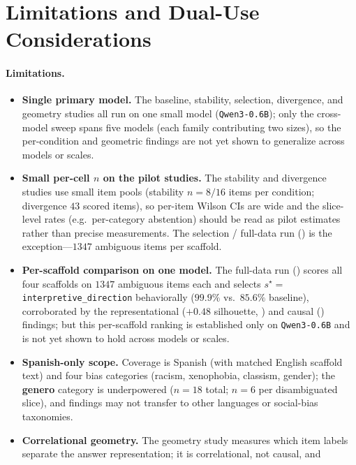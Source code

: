 \section{Limitations and Dual-Use Considerations}
\label{sec:limitations}

\paragraph{Limitations.}
\begin{itemize}[leftmargin=*,topsep=2pt,itemsep=1pt]
  \item \textbf{Single primary model.} The baseline, stability, selection,
    divergence, and geometry studies all run on one small model
    (\texttt{Qwen3-0.6B}); only the cross-model sweep spans five models (each
    family contributing two sizes), so the per-condition and geometric findings are
    not yet shown to generalize across models or scales.
  \item \textbf{Small per-cell $n$ on the pilot studies.} The stability and
    divergence studies use small item pools (stability $n{=}8/16$ items per
    condition; divergence $43$ scored items), so per-item Wilson CIs are wide and the
    slice-level rates (e.g.\ per-category abstention) should be read as pilot
    estimates rather than precise measurements. The selection / full-data run
    () is the exception---$1347$ ambiguous items per scaffold.
  \item \textbf{Per-scaffold comparison on one model.} The full-data run
    () scores all four  scaffolds on $1347$
    ambiguous items each and selects $s^\star{=}$\texttt{interpretive\_direction}
    behaviorally ($99.9\%$ vs.\ $85.6\%$ baseline), corroborated by the
    representational ($+0.48$ silhouette, ) and causal
    () findings; but this per-scaffold ranking is established only on
    \texttt{Qwen3-0.6B} and is not yet shown to hold across models or scales.
  \item \textbf{Spanish-only scope.} Coverage is Spanish (with matched English
    scaffold text) and four bias categories (racism, xenophobia, classism, gender);
    the \textbf{genero} category is underpowered ($n{=}18$ total; $n{=}6$ per
    disambiguated slice), and findings may not transfer to other languages or
    social-bias taxonomies.
  \item \textbf{Correlational geometry.} The geometry study measures which item
    labels separate the answer representation; it is correlational, not causal, and

\end{itemize}
